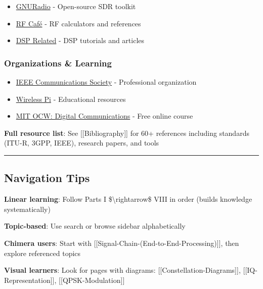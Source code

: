 \begin{itemize}
\tightlist
\item
  \href{https://www.gnuradio.org/}{GNURadio} - Open-source SDR toolkit
\item
  \href{https://www.rfcafe.com/}{RF Café} - RF calculators and
  references
\item
  \href{https://www.dsprelated.com/}{DSP Related} - DSP tutorials and
  articles
\end{itemize}

\subsubsection{Organizations \& Learning}\label{organizations-learning}

\begin{itemize}
\tightlist
\item
  \href{https://www.comsoc.org/}{IEEE Communications Society} -
  Professional organization
\item
  \href{https://wirelesspi.com/}{Wireless Pi} - Educational resources
\item
  \href{https://ocw.mit.edu/courses/6-450-principles-of-digital-communications-i-fall-2006/}{MIT
  OCW: Digital Communications} - Free online course
\end{itemize}

\textbf{ Full resource list}: See {[}{[}Bibliography{]}{]} for 60+
references including standards (ITU-R, 3GPP, IEEE), research papers, and
tools

\begin{center}\rule{0.5\linewidth}{0.5pt}\end{center}

\subsection{\texorpdfstring{ Navigation
Tips}{ Navigation Tips}}\label{navigation-tips}

\textbf{Linear learning}: Follow Parts I \$\textbackslash rightarrow\$
VIII in order (builds knowledge systematically)

\textbf{Topic-based}: Use search or browse sidebar alphabetically

\textbf{Chimera users}: Start with
{[}{[}Signal-Chain-(End-to-End-Processing){]}{]}, then explore
referenced topics

\textbf{Visual learners}: Look for pages with diagrams:
{[}{[}Constellation-Diagrams{]}{]}, {[}{[}IQ-Representation{]}{]},
{[}{[}QPSK-Modulation{]}{]}

